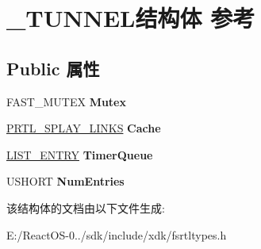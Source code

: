 \hypertarget{struct___t_u_n_n_e_l}{}\section{\+\_\+\+T\+U\+N\+N\+E\+L结构体 参考}
\label{struct___t_u_n_n_e_l}
\subsection*{Public 属性}
\begin{DoxyCompactItemize}
\item 
\mbox{\label{struct___t_u_n_n_e_l_ac7a2fa07ee79bdae52e4d9775043e56b}} 
F\+A\+S\+T\+\_\+\+M\+U\+T\+EX {\bfseries Mutex}
\item 
\mbox{\label{struct___t_u_n_n_e_l_af81fc52b376f1d0d12af5b1aec7becbe}} 
\hyperlink{struct___r_t_l___s_p_l_a_y___l_i_n_k_s}{P\+R\+T\+L\+\_\+\+S\+P\+L\+A\+Y\+\_\+\+L\+I\+N\+KS} {\bfseries Cache}
\item 
\mbox{\label{struct___t_u_n_n_e_l_aa75cd07c547d47e5ca197ae98c5c2dba}} 
\hyperlink{struct___l_i_s_t___e_n_t_r_y}{L\+I\+S\+T\+\_\+\+E\+N\+T\+RY} {\bfseries Timer\+Queue}
\item 
\mbox{\label{struct___t_u_n_n_e_l_afcbf14784971dd7d55ee72a2e4775efd}} 
U\+S\+H\+O\+RT {\bfseries Num\+Entries}
\end{DoxyCompactItemize}


该结构体的文档由以下文件生成\+:\begin{DoxyCompactItemize}
\item 
E\+:/\+React\+O\+S-\/0../sdk/include/xdk/fsrtltypes.\+h\end{DoxyCompactItemize}
